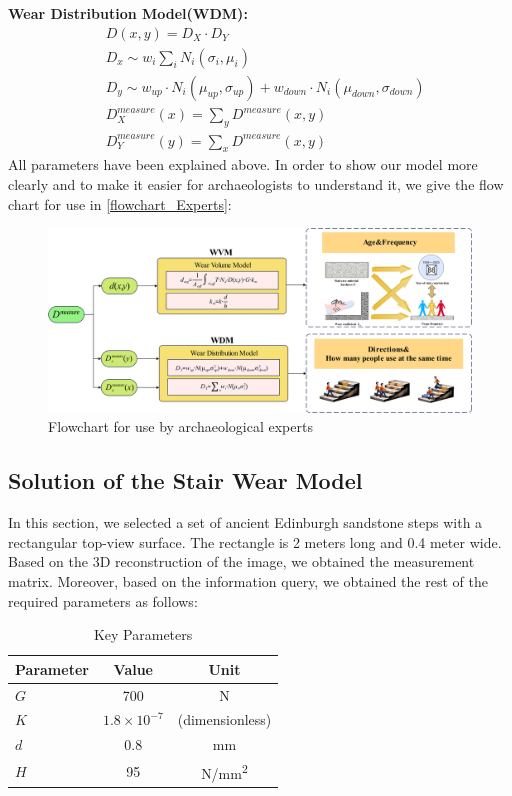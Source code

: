 \documentclass[12pt]{article}  %
\numberwithin{equation}{section} %
\begin{document}
\textbf{Wear Distribution Model(WDM):}\\
\begin{equation}
\begin{aligned}
    & D(x,y)=D_X\cdot{D_Y} \\
    & D_{x}\sim w_i\sum_{i}N_i(\sigma_i,\mu_i)\\
    & D_{y}\sim w_{up}\cdot 
      N_i(\mu_{up},\sigma_{up})+w_{down}\cdot N_i(\mu_{down},\sigma_{down})\\
    & D_X^{measure}(x)=\sum_y{D^{measure}(x,y)}\\
    & D_Y^{measure}(y)=\sum_x{D^{measure}(x,y)}
\end{aligned}
\label{WDM}
\end{equation}
All parameters have been explained above.
In order to show our model more clearly and to make it easier for archaeologists to understand it, we give the flow chart for use in \autoref{flowchart_Experts}:
\begin{figure}[H]
	\centering
 	\includegraphics[width=\linewidth]{美赛Latex模板/模型流程图1.jpg}
	\caption{Flowchart for use by archaeological experts}
	\label{flowchart_Experts}
\end{figure}

\subsection{Solution of the Stair Wear Model}
In this section, we selected a set of ancient Edinburgh sandstone steps with a rectangular top-view surface. The rectangle is 2 meters long and 0.4 meter wide. Based on the 3D reconstruction of the image, we obtained the measurement matrix. Moreover, based on the information query, we obtained the rest of the required parameters as follows:
\begin{table}[H]
    \centering
    \caption{Key Parameters}
            \renewcommand{\arraystretch}{1.5}
        \setlength{\tabcolsep}{16pt}
    \label{tab:keyparameters}
    \begin{tabular}{lcc}
        \hline
        \textbf{Parameter} & \textbf{Value} & \textbf{Unit} \\
        \hline
        $G$ & 700 & N \\
        $K$ & $1.8 \times 10^{-7}$ & (dimensionless) \\
        $d$ & 0.8 & mm \\
        $H$ & 95 & N/mm\textsuperscript{2} \\
        \hline
    \end{tabular}
\end{table}
\end{document}
